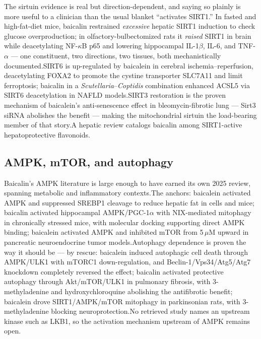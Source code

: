 \documentclass[11pt]{article}
\newcommand{\src}[1]{\allowbreak[#1]}
\begin{document}
The sirtuin evidence is real but direction-dependent, and saying so plainly is more useful to a clinician than the usual blanket ``activates SIRT1.'' In fasted and high-fat-diet mice, baicalin restrained \emph{excessive} hepatic SIRT1 induction to check glucose overproduction; in olfactory-bulbectomized rats it \emph{raised} SIRT1 in brain while deacetylating NF-$\kappa$B p65 and lowering hippocampal IL-1$\beta$, IL-6, and TNF-$\alpha$ --- one constituent, two directions, two tissues, both mechanistically documented.\src{192}\src{122} SIRT6 is up-regulated by baicalein in cerebral ischemia--reperfusion, deacetylating FOXA2 to promote the cystine transporter SLC7A11 and limit ferroptosis; baicalin in a \textit{Scutellaria}--\textit{Coptidis} combination enhanced ACSL5 via SIRT6 deacetylation in NAFLD models.\src{178}\src{194} SIRT3 restoration is the proven mechanism of baicalein's anti-senescence effect in bleomycin-fibrotic lung --- Sirt3 siRNA abolishes the benefit --- making the mitochondrial sirtuin the load-bearing member of that story.\src{177} A hepatic review catalogs baicalin among SIRT1-active hepatoprotective flavonoids.\src{193}

\subsection{AMPK, mTOR, and autophagy}

Baicalin's AMPK literature is large enough to have earned its own 2025 review, spanning metabolic and inflammatory contexts.\src{183} The anchors: baicalein activated AMPK and suppressed SREBP1 cleavage to reduce hepatic fat in cells and mice; baicalin activated hippocampal AMPK/PGC-1$\alpha$ with NIX-mediated mitophagy in chronically stressed mice, with molecular docking supporting direct AMPK binding; baicalein activated AMPK and inhibited mTOR from 5\,$\mu$M upward in pancreatic neuroendocrine tumor models.\src{163}\src{182}\src{164} Autophagy dependence is proven the way it should be --- by rescue: baicalein induced autophagic cell death through AMPK/ULK1 with mTORC1 down-regulation, and Beclin-1/Vps34/Atg5/Atg7 knockdown completely reversed the effect; baicalin activated protective autophagy through Akt/mTOR/ULK1 in pulmonary fibrosis, with 3-methyladenine and hydroxychloroquine abolishing the antifibrotic benefit; baicalein drove SIRT1/AMPK/mTOR mitophagy in parkinsonian rats, with 3-methyladenine blocking neuroprotection.\src{165}\src{188}\src{172} No retrieved study names an upstream kinase such as LKB1, so the activation mechanism upstream of AMPK remains open.\src{183}
\end{document}
